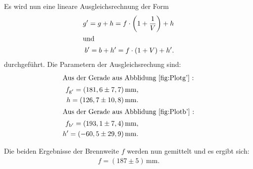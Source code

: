 Es wird nun eine lineare Ausgleichsrechnung der Form %
\begin{align}
  g'=g+h=f\cdot \left(1+\frac{1}{V}\right)+h \label{eqn:abbeg}\\
  \intertext{und}
  b'=b+h'=f\cdot \left(1+V\right)+h'. \label{eqn:abbeb}
\end{align}
durchgeführt.
Die Parametern der
Ausgleichsrechung  sind:
\begin{align*}
\intertext{Aus der Gerade aus Abblidung \ref{fig:Plotg'} :}
  f_\mathrm{g'}=(181,6\pm7,7)\,\si{\milli\meter}, \\
  h=(126,7\pm10,8)\,\si{\milli\meter}.\\
\intertext{Aus der Gerade aus Abblidung \ref{fig:Plotb'} :}
f_\mathrm{b'}=(193,1\pm7,4)\,\si{\milli\meter}, \\
  h'=(-60,5\pm29,9)\,\si{\milli\meter}. \\
\end{align*}

Die beiden Ergebnisse der Brennweite $f$
werden nun gemittelt und es ergibt sich:
\begin{align*}
  f=(187\pm5)\,\si{\milli\meter}.
\end{align*}
